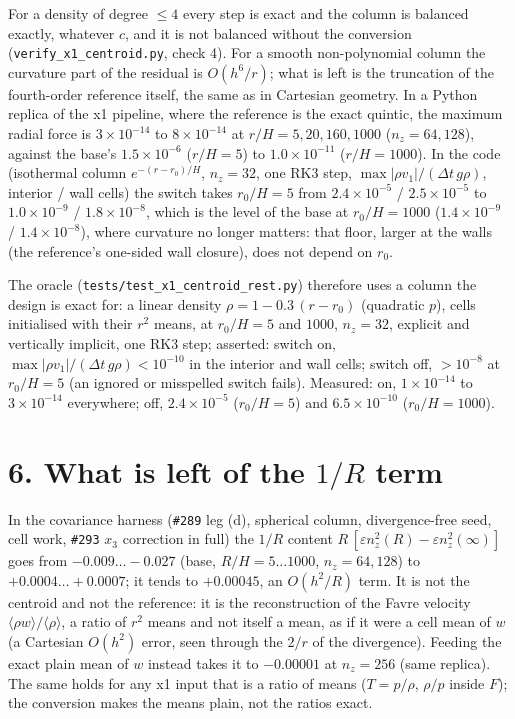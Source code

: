 \documentclass[11pt,a4paper]{article}
\begin{document}
For a density of degree $\le 4$ every step is exact and the column is balanced exactly, whatever $c$, and it
is not balanced without the conversion (\texttt{verify\_x1\_centroid.py}, check 4). For a smooth non-polynomial column
the curvature part of the residual is $O(h^6/r)$; what is left is the truncation of the fourth-order reference
itself, the same as in Cartesian geometry. In a Python replica of the x1 pipeline, where the reference is the
exact quintic, the maximum radial force is $3\times10^{-14}$ to $8\times10^{-14}$ at $r/H = 5, 20, 160, 1000$
($n_z = 64, 128$), against the base's $1.5\times10^{-6}$ ($r/H = 5$) to $1.0\times10^{-11}$ ($r/H = 1000$). In
the code (isothermal column $e^{-(r - r_0)/H}$, $n_z = 32$, one RK3 step, $\max|\rho v_1|/(\Delta t\,g\rho)$,
interior / wall cells) the switch takes $r_0/H = 5$ from $2.4\times10^{-5}$ / $2.5\times10^{-5}$ to
$1.0\times10^{-9}$ / $1.8\times10^{-8}$, which is the level of the base at $r_0/H = 1000$
($1.4\times10^{-9}$ / $1.4\times10^{-8}$), where curvature no longer matters: that floor, larger at the walls
(the reference's one-sided wall closure), does not depend on $r_0$.

The oracle (\texttt{tests/test\_x1\_centroid\_rest.py}) therefore uses a column the design is exact for: a linear
density $\rho = 1 - 0.3\,(r - r_0)$ (quadratic $p$), cells initialised with their $r^2$ means, at $r_0/H = 5$
and $1000$, $n_z = 32$, explicit and vertically implicit, one RK3 step; asserted: switch on,
$\max|\rho v_1|/(\Delta t\,g\rho) < 10^{-10}$ in the interior and wall cells; switch off, $> 10^{-8}$ at
$r_0/H = 5$ (an ignored or misspelled switch fails). Measured: on, $1\times10^{-14}$ to $3\times10^{-14}$
everywhere; off, $2.4\times10^{-5}$ ($r_0/H = 5$) and $6.5\times10^{-10}$ ($r_0/H = 1000$).

\section*{6. What is left of the $1/R$ term}

In the covariance harness (\texttt{\#289} leg (d), spherical column, divergence-free seed, cell work, \texttt{\#293} $x_3$
correction in full) the $1/R$ content $R\,[\varepsilon n_z^2(R) - \varepsilon n_z^2(\infty)]$ goes from
$-0.009 \ldots -0.027$ (base, $R/H = 5 \ldots 1000$, $n_z = 64, 128$) to $+0.0004 \ldots +0.0007$; it tends to
$+0.00045$, an $O(h^2/R)$ term. It is not the centroid and not the reference: it is the reconstruction of
the Favre velocity $\langle\rho w\rangle/\langle\rho\rangle$, a ratio of $r^2$ means and not itself a mean, as if
it were a cell mean of $w$ (a Cartesian $O(h^2)$ error, seen through the $2/r$ of the divergence). Feeding the
exact plain mean of $w$ instead takes it to $-0.00001$ at $n_z = 256$ (same replica). The
same holds for any x1 input that is a ratio of means ($T = p/\rho$, $\rho/p$ inside $F$); the conversion makes
the means plain, not the ratios exact.
\end{document}
